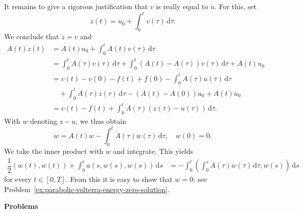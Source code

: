 It remains to give a rigorous justification that $v$ is really equal to $\dot u$. For this, set
\begin{equation}\label{eq:parabolic-time-regularity-integrated-auxiliary-solution}
z(t)=u_0+\int_0^t v(\tau)\,\mathrm{d}\tau.
\end{equation}
We conclude that $\dot z=v$ and\[\begin{aligned}
A(t)z(t)&=A(t)u_0+\int_0^t A(t)v(\tau)\,\mathrm{d}\tau\\
&=\int_0^t A(\tau)v(\tau)\,\mathrm{d}\tau+\int_0^t(A(t)-A(\tau))v(\tau)\,\mathrm{d}\tau+A(t)u_0\\
&=v(t)-v(0)-f(t)+f(0)-\int_0^t\dot A(\tau)u(\tau)\,\mathrm{d}\tau\\
&\quad+\int_0^t\dot A(\tau)z(\tau)\,\mathrm{d}\tau-(A(t)-A(0))u_0+A(t)u_0\\
&=v(t)-f(t)+\int_0^t\dot A(\tau)(z(\tau)-u(\tau))\,\mathrm{d}\tau.
\end{aligned}\]With $w$ denoting $z-u$, we thus obtain
\begin{equation}\label{eq:parabolic-time-regularity-volterra-difference-problem}
\dot w=A(t)w-\int_0^t\dot A(\tau)w(\tau)\,\mathrm{d}\tau,\quad w(0)=0.
\end{equation}
We take the inner product with $w$ and integrate. This yields
\begin{equation}\label{eq:parabolic-time-regularity-volterra-energy-identity}
\begin{aligned}\dfrac{1}{2}(w(t),w(t))+\int_0^t a(s,w(s),w(s))\,\mathrm{d}s&=-\int_0^t\left(\int_0^s\dot A(\tau)w(\tau)\,\mathrm{d}\tau,w(s)\right)\,\mathrm{d}s\end{aligned}
\end{equation}
for every $t\in[0,T]$. From this it is easy to show that $w=0$; see Problem~\ref{ex:parabolic-volterra-energy-zero-solution}.

\textbf{Problems}


